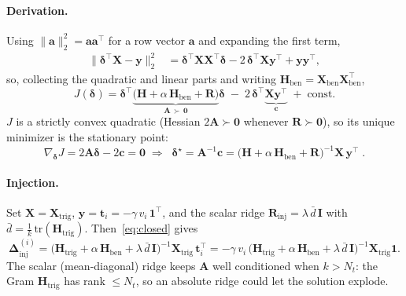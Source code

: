 \documentclass[11pt]{article}
\newcommand{\Winj}{\bm{\Delta}_{\mathrm{inj}}}
\newcommand{\X}{\mathbf{X}}
\newcommand{\Hmat}{\mathbf{H}}
\begin{document}
\paragraph{Derivation.}
Using $\big\lVert\mathbf{a}\big\rVert_2^2=\mathbf{a}\mathbf{a}^{\!\top}$ for a row vector
$\mathbf{a}$ and expanding the first term,
\begin{align}
  \big\lVert \bm\delta^{\!\top}\X - \mathbf{y}\big\rVert_2^2
  &= \bm\delta^{\!\top}\X\X^{\!\top}\bm\delta
   - 2\,\bm\delta^{\!\top}\X\mathbf{y}^{\!\top}
   + \mathbf{y}\mathbf{y}^{\!\top},
\end{align}
so, collecting the quadratic and linear parts and writing
$\Hmat_{\mathrm{ben}}=\X_{\mathrm{ben}}\X_{\mathrm{ben}}^{\!\top}$,
\begin{equation}
  J(\bm\delta)
  = \bm\delta^{\!\top}\underbrace{\big(\Hmat + \alpha\,\Hmat_{\mathrm{ben}} + \mathbf{R}\big)}_{\displaystyle \mathbf{A}\,\succ\,\mathbf{0}}\bm\delta
  \;-\; 2\,\bm\delta^{\!\top}\underbrace{\X\mathbf{y}^{\!\top}}_{\displaystyle \mathbf{c}}
  \;+\; \text{const}.
\end{equation}
$J$ is a strictly convex quadratic (Hessian $2\mathbf{A}\succ\mathbf{0}$ whenever
$\mathbf{R}\succ\mathbf{0}$), so its unique minimizer is the stationary point:
\begin{equation}
  \nabla_{\bm\delta}J = 2\mathbf{A}\bm\delta - 2\mathbf{c} = \mathbf{0}
  \;\Longrightarrow\;
  \boxed{\;\bm\delta^{\star}
  = \mathbf{A}^{-1}\mathbf{c}
  = \big(\Hmat + \alpha\,\Hmat_{\mathrm{ben}} + \mathbf{R}\big)^{-1}\X\,\mathbf{y}^{\!\top}\;}.
  \label{eq:closed}
\end{equation}

\paragraph{Injection.}
Set $\X=\X_{\mathrm{trig}}$, $\mathbf{y}=\mathbf{t}_i=-\gamma\,v_i\,\mathbf{1}^{\!\top}$, and the
scalar ridge $\mathbf{R}_{\mathrm{inj}}=\lambda\,\bar d\,\mathbf{I}$ with
$\bar d=\tfrac{1}{k}\,\mathrm{tr}(\Hmat_{\mathrm{trig}})$. Then~\eqref{eq:closed} gives
\begin{equation}
  \Winj^{(i)}
  = \big(\Hmat_{\mathrm{trig}} + \alpha\,\Hmat_{\mathrm{ben}} + \lambda\,\bar d\,\mathbf{I}\big)^{-1}\X_{\mathrm{trig}}\,\mathbf{t}_i^{\!\top}
  = -\gamma\,v_i\,\big(\Hmat_{\mathrm{trig}} + \alpha\,\Hmat_{\mathrm{ben}} + \lambda\,\bar d\,\mathbf{I}\big)^{-1}\X_{\mathrm{trig}}\mathbf{1}.
\end{equation}
The scalar (mean-diagonal) ridge keeps $\mathbf{A}$ well conditioned when $k>N_t$: the Gram
$\Hmat_{\mathrm{trig}}$ has rank $\le N_t$, so an absolute ridge could let the solution
explode.
\end{document}
